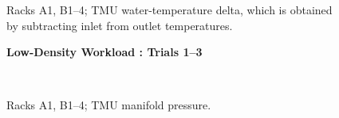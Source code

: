 \documentclass{report}
\begin{document}
\begin{figure}[!h]
\caption{Racks A1, B1--4; TMU water-temperature delta, which is obtained by subtracting inlet from outlet temperatures.}
\end{figure}
\begin{figure}[!h]
\centerline{\bfseries\large Low-Density Workload : Trials 1--3}\\
\caption{Racks A1, B1--4; TMU manifold pressure.}
\end{figure}
\end{document}
